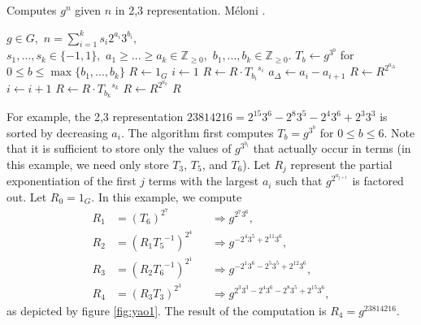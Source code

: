 \documentclass{ucalgthes1}
\theoremstyle{definition}
\newcommand{\ZZgez}{\mathbb{Z}_{\ge 0}}
\begin{document}
\begin{algorithm}[h]
\caption{Computes $g^n$ given $n$ in 2,3 representation. M\'{e}loni \cite[Section 3.2]{Meloni2009}.}
\label{alg:yaos}
\begin{algorithmic}[1]
\REQUIRE $g \in G,$ 
$n = \sum_{i=1}^k s_i2^{a_i}3^{b_i},$ \\
$s_1,...,s_k \in \{-1, 1\},$ 
$a_1 \ge ... \ge a_k \in \ZZgez,$ 
$b_1,...,b_k \in \ZZgez.$
\STATE $T_b \gets g^{3^b}$ for $0 \le b \le \max \{ b_1, ..., b_k \}$ 
\STATE $R \gets 1_G$
\STATE $i \gets 1$
	\STATE $R \gets R \cdot {T_{b_i}}^{s_i}$ 
	\STATE $a_\Delta \gets a_i - a_{i+1}$
	\STATE $R \gets R ^ {2^{a_\Delta}}$ 
	\STATE $i \gets i + 1$
\ENDWHILE
\STATE $R \gets R \cdot {T_{b_k}}^{s_k}$
\STATE $R \gets R ^ {2^{a_k}}$ 
\RETURN $R$
\end{algorithmic}
\end{algorithm}

For example, the 2,3 representation $23814216 = 2^{15} 3^6 - 2^8 3^5 - 2^4 3^6 + 2^3 3^3$ is sorted by decreasing $a_i$.  The algorithm first computes $T_b = g^{3^b}$ for $0 \le b \le 6$.  Note that it is sufficient to store only the values of $g^{3^{b_i}}$ that actually occur in terms (in this example, we need only store $T_3$, $T_5$, and $T_6$).  Let $R_j$ represent the partial exponentiation of the first $j$ terms with the largest $a_i$ such that $g^{2^{a_{j+1}}}$ is factored out.  Let $R_0 = 1_G$.  In this example, we compute 
\begin{align*}
	R_1 &= \left( T_6 \right)^{2^7} &&\Rightarrow g^{2^7 3^6}, \\
	R_2 &= \left( R_1 {T_5}^{-1} \right)^{2^4} &&\Rightarrow g^{-2^4 3^5 + 2^{11} 3^6}, \\
	R_3 &= \left( R_2 {T_6}^{-1} \right)^{2^1} &&\Rightarrow g^{-2^1 3^6 -2^5 3^5 + 2^{12} 3^6}, \\
	R_4 &= \left( R_3 T_3 \right) ^ {2^3} &&\Rightarrow g^{2^3 3^3 -2^4 3^6 -2^8 3^5 + 2^{15} 3^6},
\end{align*}
as depicted by figure \ref{fig:yao1}.  The result of the computation is $R_4 = g^{23814216}$.  
\end{document}
